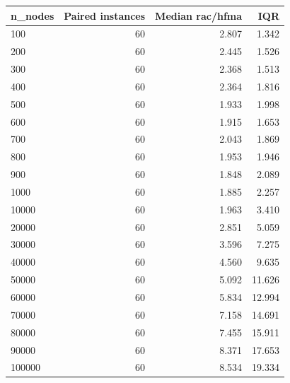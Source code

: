 \begin{tabular}{lrrr}
\toprule
n\_nodes & Paired instances & Median rac/hfma & IQR \\
\midrule
100 & 60 & 2.807 & 1.342 \\
200 & 60 & 2.445 & 1.526 \\
300 & 60 & 2.368 & 1.513 \\
400 & 60 & 2.364 & 1.816 \\
500 & 60 & 1.933 & 1.998 \\
600 & 60 & 1.915 & 1.653 \\
700 & 60 & 2.043 & 1.869 \\
800 & 60 & 1.953 & 1.946 \\
900 & 60 & 1.848 & 2.089 \\
1000 & 60 & 1.885 & 2.257 \\
10000 & 60 & 1.963 & 3.410 \\
20000 & 60 & 2.851 & 5.059 \\
30000 & 60 & 3.596 & 7.275 \\
40000 & 60 & 4.560 & 9.635 \\
50000 & 60 & 5.092 & 11.626 \\
60000 & 60 & 5.834 & 12.994 \\
70000 & 60 & 7.158 & 14.691 \\
80000 & 60 & 7.455 & 15.911 \\
90000 & 60 & 8.371 & 17.653 \\
100000 & 60 & 8.534 & 19.334 \\
\bottomrule
\end{tabular}
